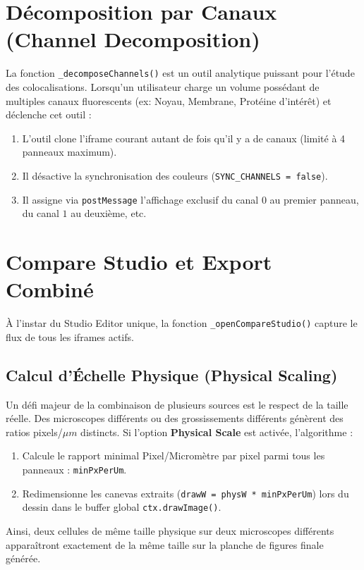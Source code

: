 \section{Décomposition par Canaux (Channel Decomposition)}

La fonction \texttt{\_decomposeChannels()} est un outil analytique puissant pour l'étude des colocalisations. 
Lorsqu'un utilisateur charge un volume possédant de multiples canaux fluorescents (ex: Noyau, Membrane, Protéine d'intérêt) et déclenche cet outil :
\begin{enumerate}
    \item L'outil clone l'iframe courant autant de fois qu'il y a de canaux (limité à 4 panneaux maximum).
    \item Il désactive la synchronisation des couleurs (\texttt{SYNC\_CHANNELS = false}).
    \item Il assigne via \texttt{postMessage} l'affichage exclusif du canal $0$ au premier panneau, du canal $1$ au deuxième, etc.
\end{enumerate}

\section{Compare Studio et Export Combiné}

À l'instar du Studio Editor unique, la fonction \texttt{\_openCompareStudio()} capture le flux de tous les iframes actifs.
\subsection{Calcul d'Échelle Physique (Physical Scaling)}
Un défi majeur de la combinaison de plusieurs sources est le respect de la taille réelle. Des microscopes différents ou des grossissements différents génèrent des ratios pixels/$\mu m$ distincts.
Si l'option \textbf{Physical Scale} est activée, l'algorithme :
\begin{enumerate}
    \item Calcule le rapport minimal Pixel/Micromètre par pixel parmi tous les panneaux : \texttt{minPxPerUm}.
    \item Redimensionne les canevas extraits (\texttt{drawW = physW * minPxPerUm}) lors du dessin dans le buffer global \texttt{ctx.drawImage()}.
\end{enumerate}
Ainsi, deux cellules de même taille physique sur deux microscopes différents apparaîtront exactement de la même taille sur la planche de figures finale générée.
